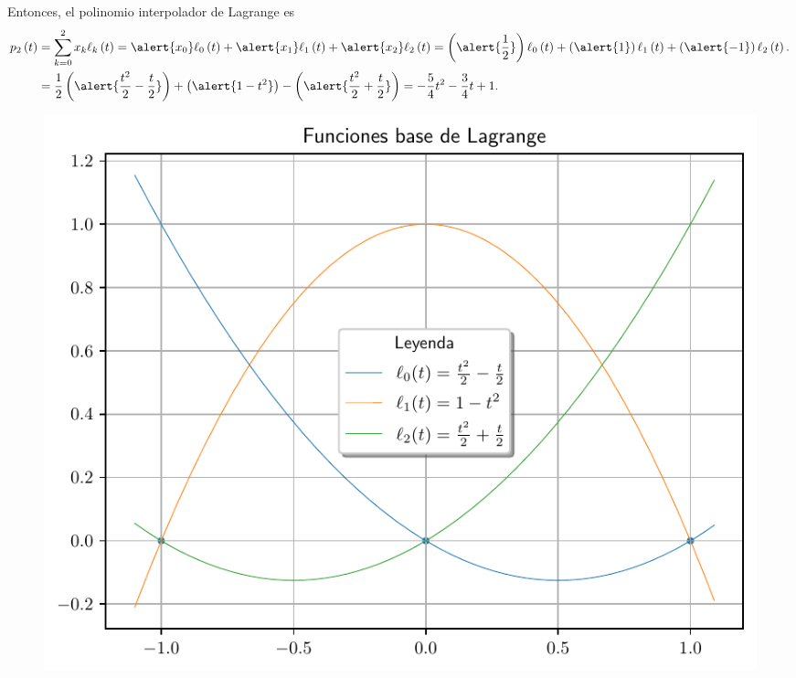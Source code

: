 \begin{frame}
\begin{solution}
		Entonces, el polinomio interpolador de Lagrange es
		\begin{align*}
			p_{2}\left(t\right) & =
			\sum\limits_{k=0}^{2}
			x_{k}
			\ell_{k}\left(t\right)=
			\alert{x_{0}}
			\ell_{0}\left(t\right)+
			\alert{x_{1}}
			\ell_{1}\left(t\right)+
			\alert{x_{2}}\ell_{2}\left(t\right)=
			\left(
			\alert{\dfrac{1}{2}}
			\right)
			\ell_{0}\left(t\right)+
			\left(
			\alert{1}
			\right)
			\ell_{1}\left(t\right)+
			\left(
			\alert{-1}
			\right)
			\ell_{2}\left(t\right). \\
			                    & =
			\dfrac{1}{2}
			\left(
			\alert{\dfrac{t^{2}}{2}-\dfrac{t}{2}}
			\right)+
			\left(
			\alert{1-t^{2}}
			\right)-
			\left(
			\alert{\dfrac{t^{2}}{2}+\dfrac{t}{2}}
			\right)=
			-\dfrac{5}{4}t^{2}-\dfrac{3}{4}t+1.
		\end{align*}
	\end{solution}
\end{frame}

\begin{frame}
	\begin{solution}
		\begin{figure}[ht!]
			\centering
			\includegraphics[width=.72\paperwidth]{p6_lagrange}
		\end{figure}
	\end{solution}
\end{frame}

